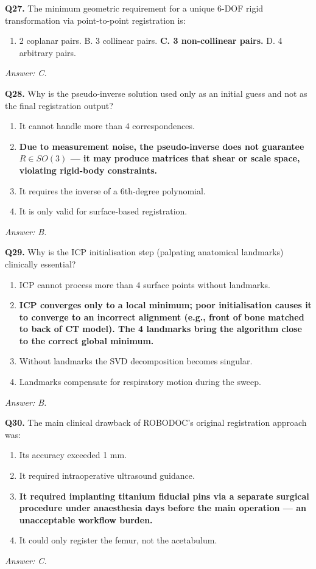 \documentclass[11pt,a4paper,twoside]{report}
\begin{document}
\bigskip
\textbf{Q27.} The minimum geometric requirement for a unique 6-DOF rigid transformation via point-to-point registration is:
\begin{enumerate}[label=\Alph*.]
    \item 2 coplanar pairs. \quad B. 3 collinear pairs. \quad \textbf{C. 3 non-collinear pairs.} \quad D. 4 arbitrary pairs.
\end{enumerate}
\textit{Answer: C.}

\bigskip
\textbf{Q28.} Why is the pseudo-inverse solution used only as an initial guess and not as the final registration output?
\begin{enumerate}[label=\Alph*.]
    \item It cannot handle more than 4 correspondences.
    \item \textbf{Due to measurement noise, the pseudo-inverse does not guarantee $R \in SO(3)$ — it may produce matrices that shear or scale space, violating rigid-body constraints.}
    \item It requires the inverse of a 6th-degree polynomial.
    \item It is only valid for surface-based registration.
\end{enumerate}
\textit{Answer: B.}

\bigskip
\textbf{Q29.} Why is the ICP initialisation step (palpating anatomical landmarks) clinically essential?
\begin{enumerate}[label=\Alph*.]
    \item ICP cannot process more than 4 surface points without landmarks.
    \item \textbf{ICP converges only to a local minimum; poor initialisation causes it to converge to an incorrect alignment (e.g., front of bone matched to back of CT model). The 4 landmarks bring the algorithm close to the correct global minimum.}
    \item Without landmarks the SVD decomposition becomes singular.
    \item Landmarks compensate for respiratory motion during the sweep.
\end{enumerate}
\textit{Answer: B.}

\bigskip
\textbf{Q30.} The main clinical drawback of ROBODOC's original registration approach was:
\begin{enumerate}[label=\Alph*.]
    \item Its accuracy exceeded 1 mm.
    \item It required intraoperative ultrasound guidance.
    \item \textbf{It required implanting titanium fiducial pins via a separate surgical procedure under anaesthesia days before the main operation — an unacceptable workflow burden.}
    \item It could only register the femur, not the acetabulum.
\end{enumerate}
\textit{Answer: C.}
\end{document}
